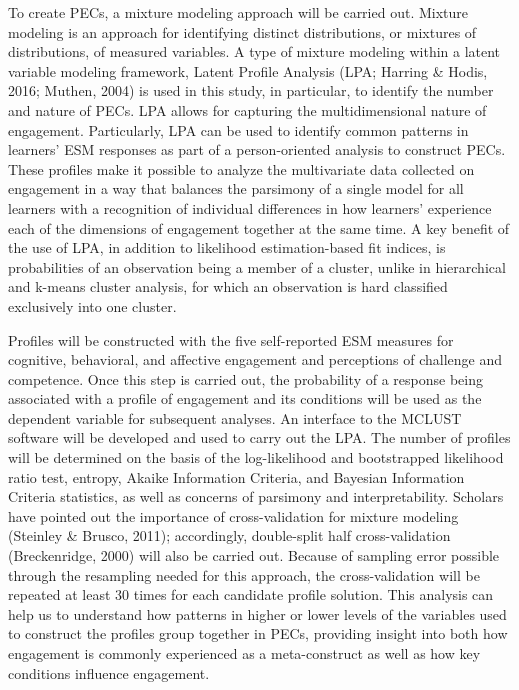 \documentclass[]{msu-thesis}
\theoremstyle{definition}
\theoremstyle{definition}
\theoremstyle{definition}
\theoremstyle{remark}
\begin{document}
To create PECs, a mixture modeling approach will be carried out. Mixture
modeling is an approach for identifying distinct distributions, or
mixtures of distributions, of measured variables. A type of mixture
modeling within a latent variable modeling framework, Latent Profile
Analysis (LPA; Harring \& Hodis, 2016; Muthen, 2004) is used in this
study, in particular, to identify the number and nature of PECs. LPA
allows for capturing the multidimensional nature of engagement.
Particularly, LPA can be used to identify common patterns in learners'
ESM responses as part of a person-oriented analysis to construct PECs.
These profiles make it possible to analyze the multivariate data
collected on engagement in a way that balances the parsimony of a single
model for all learners with a recognition of individual differences in
how learners' experience each of the dimensions of engagement together
at the same time. A key benefit of the use of LPA, in addition to
likelihood estimation-based fit indices, is probabilities of an
observation being a member of a cluster, unlike in hierarchical and
k-means cluster analysis, for which an observation is hard classified
exclusively into one cluster.

Profiles will be constructed with the five self-reported ESM measures
for cognitive, behavioral, and affective engagement and perceptions of
challenge and competence. Once this step is carried out, the probability
of a response being associated with a profile of engagement and its
conditions will be used as the dependent variable for subsequent
analyses. An interface to the MCLUST software will be developed and used
to carry out the LPA. The number of profiles will be determined on the
basis of the log-likelihood and bootstrapped likelihood ratio test,
entropy, Akaike Information Criteria, and Bayesian Information Criteria
statistics, as well as concerns of parsimony and interpretability.
Scholars have pointed out the importance of cross-validation for mixture
modeling (Steinley \& Brusco, 2011); accordingly, double-split half
cross-validation (Breckenridge, 2000) will also be carried out. Because
of sampling error possible through the resampling needed for this
approach, the cross-validation will be repeated at least 30 times for
each candidate profile solution. This analysis can help us to understand
how patterns in higher or lower levels of the variables used to
construct the profiles group together in PECs, providing insight into
both how engagement is commonly experienced as a meta-construct as well
as how key conditions influence engagement.
\end{document}
